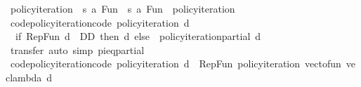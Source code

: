 \begin{isabellebody}
\isamarkupfalse%
\ policy{\isacharunderscore}{\kern0pt}iteration{\isacharprime}{\kern0pt}\ {\isacharcolon}{\kern0pt}{\isacharcolon}{\kern0pt}\ {\isachardoublequoteopen}{\isacharparenleft}{\kern0pt}{\isacharprime}{\kern0pt}s{\isacharcomma}{\kern0pt}\ {\isacharprime}{\kern0pt}a{\isacharparenright}{\kern0pt}\ Fun\ {\isasymRightarrow}\ {\isacharparenleft}{\kern0pt}{\isacharprime}{\kern0pt}s{\isacharcomma}{\kern0pt}\ {\isacharprime}{\kern0pt}a{\isacharparenright}{\kern0pt}\ Fun{\isachardoublequoteclose}\ \ policy{\isacharunderscore}{\kern0pt}iteration%
\isadelimproof
%
\endisadelimproof
%
\isatagproof
\isacommand{{\isachardot}{\kern0pt}}\isamarkupfalse%
%
\endisatagproof
{\isafoldproof}%
%
\isadelimproof
%
\endisadelimproof
\isanewline
\isanewline
{}\isamarkupfalse%
\ code{\isacharunderscore}{\kern0pt}policy{\isacharunderscore}{\kern0pt}iteration{\isacharprime}{\kern0pt}{\isacharbrackleft}{\kern0pt}code{\isacharbrackright}{\kern0pt}{\isacharcolon}{\kern0pt}\ {\isachardoublequoteopen}policy{\isacharunderscore}{\kern0pt}iteration{\isacharprime}{\kern0pt}\ d\ {\isacharequal}{\kern0pt}\isanewline
\ \ {\isacharparenleft}{\kern0pt}if\ Rep{\isacharunderscore}{\kern0pt}Fun\ d\ {\isasymnotin}\ D\isactrlsub D\ then\ d\ else\ \ {\isacharparenleft}{\kern0pt}policy{\isacharunderscore}{\kern0pt}iteration{\isacharunderscore}{\kern0pt}partial{\isacharprime}{\kern0pt}\ d{\isacharparenright}{\kern0pt}{\isacharparenright}{\kern0pt}{\isachardoublequoteclose}\isanewline
%
\isadelimproof
\ \ %
\endisadelimproof
%
\isatagproof
{}\isamarkupfalse%
\ transfer\ {\isacharparenleft}{\kern0pt}auto\ simp{\isacharcolon}{\kern0pt}\ pi{\isacharunderscore}{\kern0pt}eq{\isacharunderscore}{\kern0pt}partial{\isacharparenright}{\kern0pt}%
\endisatagproof
{\isafoldproof}%
%
\isadelimproof
\isanewline
%
\endisadelimproof
\isanewline
{}\isamarkupfalse%
\ code{\isacharunderscore}{\kern0pt}policy{\isacharunderscore}{\kern0pt}iteration{\isacharbrackleft}{\kern0pt}code{\isacharbrackright}{\kern0pt}{\isacharcolon}{\kern0pt}\ {\isachardoublequoteopen}policy{\isacharunderscore}{\kern0pt}iteration\ d\ {\isacharequal}{\kern0pt}\ Rep{\isacharunderscore}{\kern0pt}Fun\ {\isacharparenleft}{\kern0pt}policy{\isacharunderscore}{\kern0pt}iteration{\isacharprime}{\kern0pt}\ {\isacharparenleft}{\kern0pt}vec{\isacharunderscore}{\kern0pt}to{\isacharunderscore}{\kern0pt}fun\ {\isacharparenleft}{\kern0pt}vec{\isacharunderscore}{\kern0pt}lambda\ d{\isacharparenright}{\kern0pt}{\isacharparenright}{\kern0pt}{\isacharparenright}{\kern0pt}{\isachardoublequoteclose}\isanewline

\end{isabellebody}
